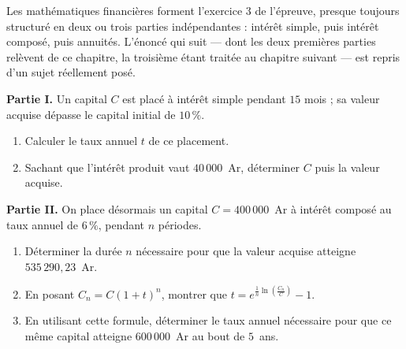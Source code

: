 \begin{annales}
Les mathématiques financières forment l'exercice 3 de l'épreuve, presque
toujours structuré en deux ou trois parties indépendantes : intérêt simple,
puis intérêt composé, puis annuités. L'énoncé qui suit — dont les deux
premières parties relèvent de ce chapitre, la troisième étant traitée au
chapitre suivant — est repris d'un sujet réellement posé.

\textbf{Partie I.} Un capital $C$ est placé à intérêt simple pendant
$15$ mois ; sa valeur acquise dépasse le capital initial de $10\,\%$.
\begin{enumerate}[label=\textbf{\alph*)}, leftmargin=*, itemsep=0.15em]
  \item Calculer le taux annuel $t$ de ce placement.
  \item Sachant que l'intérêt produit vaut $40\,000$~Ar, déterminer $C$ puis
        la valeur acquise.
\end{enumerate}

\textbf{Partie II.} On place désormais un capital $C = 400\,000$~Ar à
intérêt composé au taux annuel de $6\,\%$, pendant $n$ périodes.
\begin{enumerate}[label=\textbf{\alph*)}, leftmargin=*, itemsep=0.15em]
  \item Déterminer la durée $n$ nécessaire pour que la valeur acquise atteigne
        $535\,290{,}23$~Ar.
  \item En posant $C_{n} = C(1+t)^{n}$, montrer que
        $t = e^{\frac1n\ln\left(\frac{C_{n}}{C}\right)}-1$.
  \item En utilisant cette formule, déterminer le taux annuel nécessaire
        pour que ce même capital atteigne $600\,000$~Ar au bout de $5$~ans.
\end{enumerate}
\end{annales}

